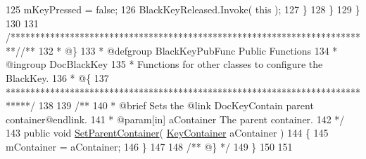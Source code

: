 \begin{DoxyCodeInclude}
125                 mKeyPressed = \textcolor{keyword}{false};
126                 BlackKeyReleased.Invoke( \textcolor{keyword}{this} );
127             \}
128         \}
129     \}
130 
131     \textcolor{comment}{/*************************************************************************/}\textcolor{comment}{/** }
132 \textcolor{comment}{     * @\}}
133 \textcolor{comment}{     * @defgroup BlackKeyPubFunc Public Functions}
134 \textcolor{comment}{     * @ingroup DocBlackKey}
135 \textcolor{comment}{     * Functions for other classes to configure the BlackKey.}
136 \textcolor{comment}{     * @\{}
137 \textcolor{comment}{    *****************************************************************************/}
138 \textcolor{comment}{}
139 \textcolor{comment}{    /**}
140 \textcolor{comment}{     * @brief Sets the @link DocKeyContain parent container@endlink.}
141 \textcolor{comment}{     * @param[in] aContainer The parent container.}
142 \textcolor{comment}{    */}
143     \textcolor{keyword}{public} \textcolor{keywordtype}{void} \hyperlink{group___black_key_pub_func_ga49d807a46e36ba19211be329db1cbd2e}{SetParentContainer}( \hyperlink{class_key_container}{KeyContainer} aContainer )
144     \{
145         mContainer = aContainer;
146     \}
147 \textcolor{comment}{}
148 \textcolor{comment}{    /** @\} */}
149 \}
150 
151 
\end{DoxyCodeInclude}
 